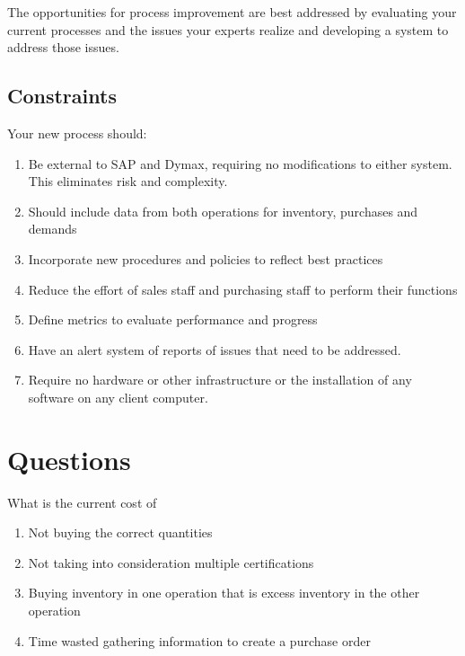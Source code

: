 \documentclass[letterpaper,10pt,english]{sphinxmanual}
\begin{document}
The opportunities for process improvement are best addressed by
evaluating your current processes and the issues your experts realize
and developing a system to address those issues.


\section{Constraints}
\label{BusinessProcessReengineering:constraints}
Your new process should:
\begin{enumerate}
\item {} 
Be external to SAP and Dymax, requiring no modifications to either
system. This eliminates risk and complexity.

\item {} 
Should include data from both operations for inventory, purchases and
demands

\item {} 
Incorporate new procedures and policies to reflect best practices

\item {} 
Reduce the effort of sales staff and purchasing staff to perform
their functions

\item {} 
Define metrics to evaluate performance and progress

\item {} 
Have an alert system of reports of issues that need to be addressed.

\item {} 
Require no hardware or other infrastructure or the installation of
any software on any client computer.

\end{enumerate}


\chapter{Questions}
\label{BusinessProcessReengineering:id5}
What is the current cost of
\begin{enumerate}
\item {} 
Not buying the correct quantities

\item {} 
Not taking into consideration multiple certifications

\item {} 
Buying inventory in one operation that is excess inventory in the
other operation

\item {} 
Time wasted gathering information to create a purchase order

\end{enumerate}
\end{document}
